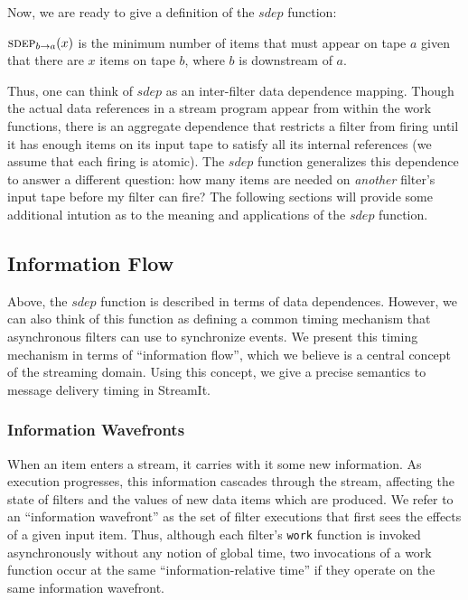 Now, we are ready to give a definition of the $sdep$ function:
\begin{definition}
$\mi{a}{b}(x)$ is the minimum number of items that must appear on tape
$a$ given that there are $x$ items on tape $b$, where $b$ is
downstream of $a$.
\end{definition}
Thus, one can think of $sdep$ as an inter-filter data dependence
mapping.  Though the actual data references in a stream program appear
from within the work functions, there is an aggregate dependence that
restricts a filter from firing until it has enough items on its input
tape to satisfy all its internal references (we assume that each
firing is atomic).  The $sdep$ function generalizes this dependence to
answer a different question: how many items are needed on {\it
another} filter's input tape before my filter can fire?  The following
sections will provide some additional intution as to the meaning and
applications of the $sdep$ function.

\subsection{Information Flow}
\label{sec:informationflow}

Above, the $sdep$ function is described in terms of data dependences.
However, we can also think of this function as defining a common
timing mechanism that asynchronous filters can use to synchronize
events.  We present this timing mechanism in terms of ``information
flow'', which we believe is a central concept of the streaming domain.
Using this concept, we give a precise semantics to message delivery
timing in StreamIt.

\subsubsection{Information Wavefronts}

When an item enters a stream, it carries with it some new information.
As execution progresses, this information cascades through the stream,
affecting the state of filters and the values of new data items which
are produced.  We refer to an ``information wavefront'' as the set of
filter executions that first sees the effects of a given input item.
Thus, although each filter's {\tt work} function is invoked
asynchronously without any notion of global time, two invocations of a
work function occur at the same ``information-relative time'' if they
operate on the same information wavefront.

